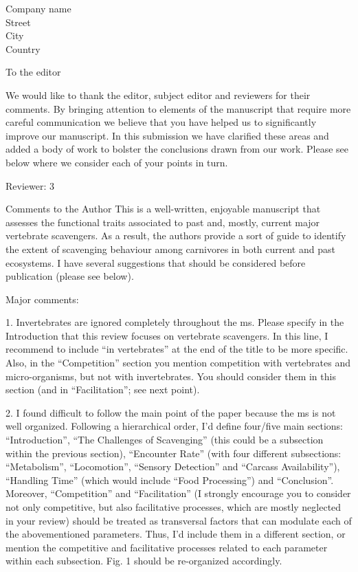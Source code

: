 \documentclass{letter}
\begin{document}
\begin{letter}{Company name \\ Street\\ City\\ Country}
\opening{To the editor}

We would like to thank the editor, subject editor and reviewers for their comments. By bringing attention to elements of the manuscript that require more careful communication we believe that you have helped us to significantly improve our manuscript. In this submission we have clarified these areas and added a body of work to bolster the conclusions drawn from our work. Please see below where we consider each of your points in turn. 

Reviewer: 3

Comments to the Author
This is a well-written, enjoyable manuscript that assesses the functional traits associated to past and, mostly, current major vertebrate scavengers. As a result, the authors provide a sort of guide to identify the extent of scavenging behaviour among carnivores in both current and past ecosystems. I have several suggestions that should be considered before publication (please see below).

Major comments:

1. Invertebrates are ignored completely throughout the ms. Please specify in the Introduction that this review focuses on vertebrate scavengers. In this line, I recommend to include “in vertebrates” at the end of the title to be more specific. Also, in the “Competition” section you mention competition with vertebrates and micro-organisms, but not with invertebrates. You should consider them in this section (and in “Facilitation”; see next point).

2. I found difficult to follow the main point of the paper because the ms is not well organized. Following a hierarchical order, I’d define four/five main sections: “Introduction”, “The Challenges of Scavenging” (this could be a subsection within the previous section), “Encounter Rate” (with four different subsections: “Metabolism”, “Locomotion”, “Sensory Detection” and “Carcass Availability”), “Handling Time” (which would include “Food Processing”) and “Conclusion”. \\ 

Moreover, “Competition” and “Facilitation” (I strongly encourage you to consider not only competitive, but also facilitative processes, which are mostly neglected in your review) should be treated as transversal factors that can modulate each of the abovementioned parameters. Thus, I’d include them in a different section, or mention the competitive and facilitative processes related to each parameter within each subsection. Fig. 1 should be re-organized accordingly.


\end{letter}
\end{document}
